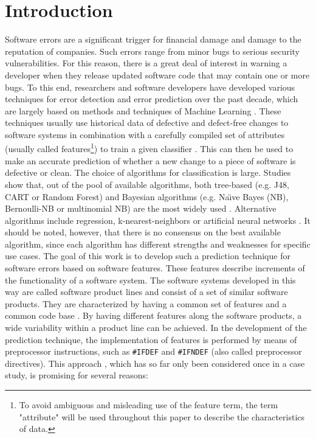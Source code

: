
\section{Introduction}

Software errors are a significant trigger for financial damage and damage to the reputation of companies. Such errors range from minor bugs to serious security vulnerabilities. For this reason, there is a great deal of interest in warning a developer when they release updated software code that may contain one or more bugs. To this end, researchers and software developers have developed various techniques for error detection and error prediction over the past decade, which are largely based on methods and techniques of Machine Learning \cite{Challagulla2008}. These techniques usually use historical data of defective and defect-free changes to software systems in combination with a carefully compiled set of attributes (usually called features\footnote{To avoid ambiguous and misleading use of the feature term, the term "attribute" will be used throughout this paper to describe the characteristics of data.}) to train a given classifier \cite{Alsaeedi2019,Hammouri2018}. This can then be used to make an accurate prediction of whether a new change to a piece of software is defective or clean. The choice of algorithms for classification is large. Studies show that, out of the pool of available algorithms, both tree-based (e.g. J48, CART or Random Forest) and Bayesian algorithms (e.g. Na\"{\i}ve Bayes (NB), Bernoulli-NB or multinomial NB) are the most widely used \cite{Son2019}. Alternative algorithms include regression, k-nearest-neighbors or artificial neural networks \cite{Challagulla2008}. It should be noted, however, that there is no consensus on the best available algorithm, since each algorithm has different strengths and weaknesses for specific use cases. The goal of this work is to develop such a prediction technique for software errors based on software features. These features describe increments of the functionality of a software system. The software systems developed in this way are called software product lines and consist of a set of similar software products. They are characterized by having a common set of features and a common code base \cite{Thuem2014}. By having different features along the software products, a wide variability within a product line can be achieved. In the development of the prediction technique, the implementation of features is performed by means of preprocessor instructions, such as \texttt{\#IFDEF} and \texttt{\#IFNDEF} (also called preprocessor directives). This approach \cite{Queiroz2016}, which has so far only been considered once in a case study, is promising for several reasons:

